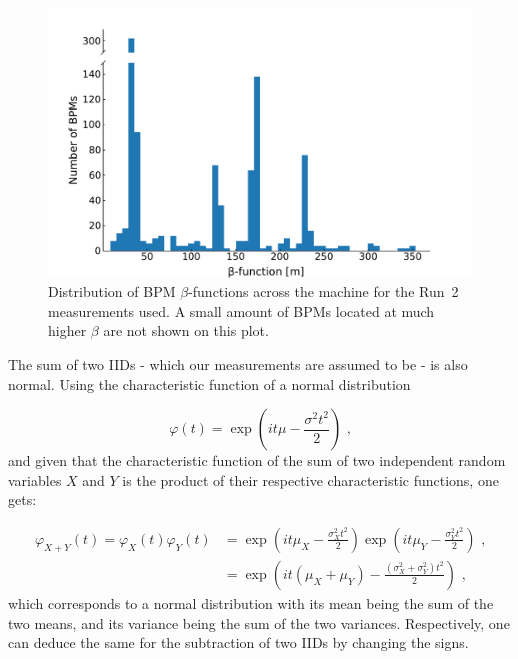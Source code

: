 \begin{figure}[!htb]
    \centering
    \includegraphics*[width=\textwidth]{Figures/Other_Studies/bpms_betas_histogram.pdf}
    \caption{Distribution of BPM \(\beta\)-functions across the machine for the Run~\num{2} measurements used. A small amount of BPMs located at much higher \(\beta\) are not shown on this plot.}
    \label{figure:bpms_betas_histogram}
\end{figure}

The sum of two IIDs - which our measurements are assumed to be - is also normal.
Using the characteristic function of a normal distribution

\begin{equation}
    \varphi(t) = \exp \left( it \mu - \frac{\sigma^2 t^2}{2} \right) \text{ ,}
    \label{equations:normal_distribution_characteristic_function}
\end{equation}
and given that the characteristic function of the sum of two independent random variables \(X\) and \(Y\) is the product of their respective characteristic functions, one gets:

\begin{equation}
    \begin{aligned}
        \varphi_{X+Y}(t) = \varphi_{X}(t) \varphi_{Y}(t) &= \exp \left( it \mu_{X} - \frac{\sigma_{X}^2 t^2}{2} \right) \exp \left(it \mu_{Y} - \frac{\sigma_{Y}^2 t^2}{2} \right)  \text{ ,} \\
                                                         &= \exp \left( it \left( \mu_{X} + \mu_{Y} \right) - \frac{\left( \sigma_{X}^2 + \sigma_{Y}^2 \right) t^2}{2} \right)  \text{ ,}
    \end{aligned}
\end{equation}
which corresponds to a normal distribution with its mean being the sum of the two means, and its variance being the sum of the two variances.
Respectively, one can deduce the same for the subtraction of two IIDs by changing the signs.

